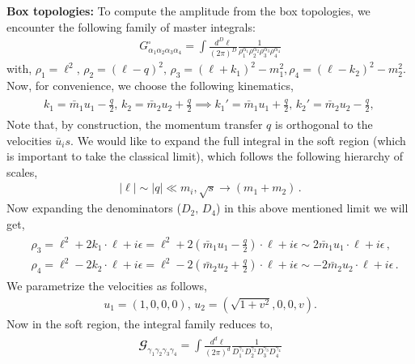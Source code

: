 \\\\
\textbf{Box topologies:}
To compute the amplitude from the box topologies, we encounter the following family of master integrals:
\begin{align}
    G^{\square}_{\alpha_1\alpha_2\alpha_3\alpha_4}=\int \frac{d^D\ell}{(2\pi)^D}\frac{1}{\rho_1^{\alpha_1}\rho_2^{\alpha_2}\rho_3^{\alpha_3}\rho_4^{\alpha_4}}
\end{align}
with, $\rho_1=\ell^2,\,\rho_2=(\ell-q)^2,\,\rho_3=(\ell+k_1)^2-m_1^2, \rho_4=(\ell-k_2)^2-m_2^2$. Now, for convenience, we choose the following kinematics,
\begin{align}
    \begin{split}
        k_1=\bar m_1 u_1-\frac{q}{2}, \,k_2=\bar m_2 u_2+\frac{q}{2}\implies k_1'=\bar m_1 u_1+\frac{q}{2},\,k_2'=\bar m_2 u_2-\frac{q}{2},\,
    \end{split}
\end{align}
Note that, by construction, the momentum transfer $q$ is orthogonal to the velocities $\bar u_is$. We would like to expand the full integral in the  soft region (which is important to take the classical limit), which follows the following hierarchy of scales,
\begin{align}
    |\ell|\sim |q|\ll m_i, \sqrt{s}\to (m_1+m_2)\,.
\end{align}
Now expanding the denominators ($D_2, \,D_4$) in this above mentioned limit we will get,
\begin{align}
\begin{split}
    &\rho_3=\ell^2+2 k_1\cdot \ell+i\epsilon= \ell^2+2 (\bar m_1u_1-\frac{q}{2})\cdot \ell+i\epsilon \sim 2 \bar m_1 u_1\cdot \ell+i\epsilon\,,\\ &
    \rho_4=\ell^2-2 k_2\cdot \ell+i\epsilon= \ell^2-2 (\bar m_2u_2+\frac{q}{2})\cdot \ell+i\epsilon \sim -2 \bar m_2 u_2\cdot \ell+i\epsilon\,.
    \end{split}
\end{align}
We parametrize the velocities as follows,
\begin{align}
    u_1=(1,0,0,0), \,u_2=(\sqrt{1+v^2},0,0,v).
\end{align}
Now in the soft region, the integral family reduces to,
\begin{align}
    \begin{split}
        \mathbfcal{G}^{}
_{\gamma_1\gamma_2\gamma_3\gamma_4}=\int \frac{d^d\ell}{(2\pi)^d}\frac{1}{D_1^{\gamma_1}D_2^{\gamma_2}D_3^{\gamma_3}D_4^{\gamma_4}}
    \end{split}
\end{align}
